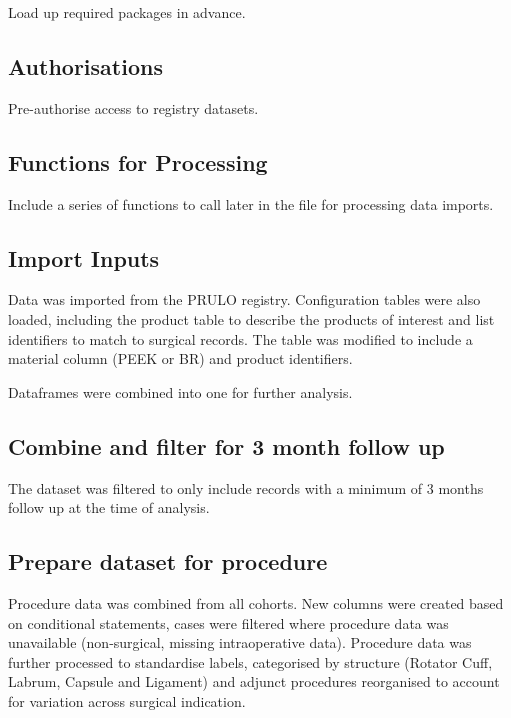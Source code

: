 \documentclass[
]{article}
\begin{document}
Load up required packages in advance.

\subsection{Authorisations}\label{authorisations}

Pre-authorise access to registry datasets.

\subsection{Functions for Processing}\label{functions-for-processing}

Include a series of functions to call later in the file for processing
data imports.

\subsection{Import Inputs}\label{import-inputs}

Data was imported from the PRULO registry. Configuration tables were
also loaded, including the product table to describe the products of
interest and list identifiers to match to surgical records. The table
was modified to include a material column (PEEK or BR) and product
identifiers.

Dataframes were combined into one for further analysis.

\subsection{Combine and filter for 3 month follow
up}\label{combine-and-filter-for-3-month-follow-up}

The dataset was filtered to only include records with a minimum of 3
months follow up at the time of analysis.

\subsection{Prepare dataset for
procedure}\label{prepare-dataset-for-procedure}

Procedure data was combined from all cohorts. New columns were created
based on conditional statements, cases were filtered where procedure
data was unavailable (non-surgical, missing intraoperative data).
Procedure data was further processed to standardise labels, categorised
by structure (Rotator Cuff, Labrum, Capsule and Ligament) and adjunct
procedures reorganised to account for variation across surgical
indication.
\end{document}
